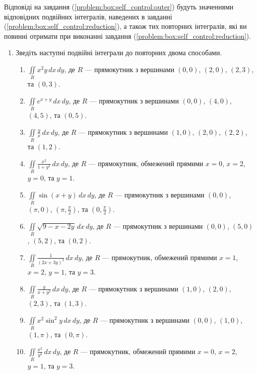 Відповіді на завдання (\ref{problem:box:self_control:outer}) будуть значеннями відповідних подвійних інтегралів, наведених в завданні (\ref{problem:box:self_control:reduction}), а також тих повторних інтегралів, які ви повинні отримати при виконанні завдання (\ref{problem:box:self_control:reduction}).
\begin{enumerate}
\item\label{problem:box:self_control:reduction} Зведіть наступні подвійні інтеграли до повторних двома способами.
    \begin{enumerate}[label*=\arabic*.]
        \item $\iint\limits_R x^2y\,dx\,dy$, де $R$ --- прямокутник з вершинами $(0, 0)$, $(2, 0)$, $(2, 3)$, та $(0, 3)$.
        \item $\iint\limits_R e^{x + y}\,dx\,dy$, де $R$ --- прямокутник з вершинами $(0, 0)$, $(4, 0)$, $(4, 5)$, та $(0, 5)$.
        \item $\iint\limits_R \frac{y}{x}\,dx\,dy$, де $R$ --- прямокутник з вершинами $(1, 0)$, $(2, 0)$, $(2, 2)$, та $(1, 2)$.
        \item $\iint\limits_R \frac{x^2}{1+y^2}\,dx\,dy$, де $R$ --- прямокутник, обмежений прямими $x=0$, $x=2$, $y=0$, та $y=1$.
        \item $\iint\limits_R \sin(x + y)\,dx\,dy$, де $R$ --- прямокутник з вершинами $(0, 0)$, $(\pi, 0)$, $(\pi, \frac{\pi}{2})$, та $(0, \frac{\pi}{2})$.
        \item $\iint\limits_R \sqrt{ 9 -x - 2y}\,dx\,dy$, де $R$ --- прямокутник з вершинами $(0, 0)$, $(5, 0)$, $(5, 2)$, та $(0, 2)$.
        \item $\iint\limits_R \frac{1}{\left( 2 x + 3 y \right)^2}\,dx\,dy$, де $R$ --- прямокутник, обмежений прямими $x=1$, $x=2$, $y=1$, та $y=3$.
        \item $\iint\limits_R \frac{y}{x+y^2}\,dx\,dy$, де $R$ --- прямокутник з вершинами $(1, 0)$, $(2, 0)$, $(2, 3)$, та $(1, 3)$.
        \item $\iint\limits_R x^2\sin^2y\,dx\,dy$, де $R$ --- прямокутник з вершинами $(0, 0)$, $(1, 0)$, $(1, \pi)$, та $(0, \pi)$.
        \item $\iint\limits_R \frac{x^2}{y^2}\,dx\,dy$, де $R$ --- прямокутник, обмежений прямими $x=0$, $x=2$, $y=1$, та $y=3$.
    \end{enumerate}


\end{enumerate}
